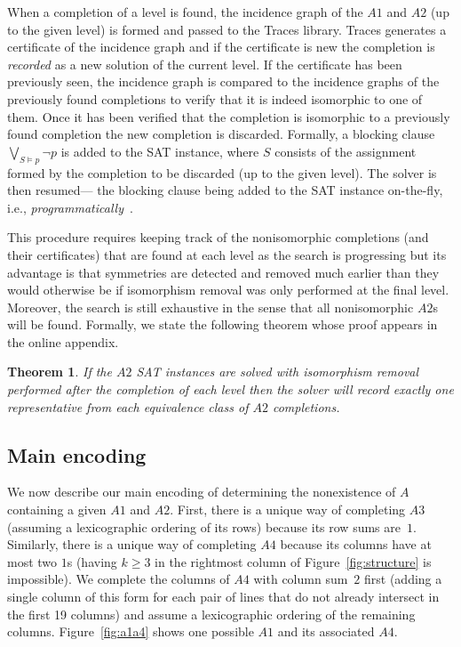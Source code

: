 \documentclass[letterpaper]{article}
\newtheorem{theorem}{Theorem}
\begin{document}
When a completion of a level is found, the
incidence graph of the $A1$
and $A2$ (up to the given level) is formed and passed to the
Traces library.  Traces
generates a certificate of the incidence graph and if the certificate
is new the completion is \emph{recorded} as a new solution of the current
level.  If the certificate has been previously seen, the incidence
graph is compared to the incidence graphs of the previously
found completions to verify that it is indeed isomorphic to one of them.
Once it has been verified that the completion is isomorphic to a previously
found completion the new completion is discarded.
Formally, a blocking clause $\bigvee_{S\models p}\lnot p$ is added
to the SAT instance, where $S$ consists of the assignment
formed by the completion to be discarded (up to the given level).
The solver is then resumed---%
the blocking clause being added to the SAT instance on-the-fly, i.e.,
\emph{programmatically}~\cite{ganesh2012lynx}.

This procedure requires keeping track of the nonisomorphic completions
(and their certificates) that
are found at each level as the search is progressing but its advantage
is that symmetries are detected and removed much earlier than they
would otherwise be if isomorphism removal was only performed at the final level.
Moreover, the search is still exhaustive in the sense that all
nonisomorphic $A2$s will be found.
Formally, we state the following theorem whose proof appears in the
online appendix.

\begin{theorem}\label{thm:record}
If the $A2$ SAT instances are solved with isomorphism removal performed
after the completion of each level then
the solver will record exactly one
representative from each equivalence class
of $A2$ completions.
\end{theorem}

\subsection{Main encoding}\label{subsec:main}

We now describe our main encoding of determining the nonexistence
of $A$ containing a given $A1$ and $A2$.  First, 
there is a unique way of completing $A3$ (assuming a lexicographic ordering of its rows)
because its row sums are~$1$.  Similarly,
there is a unique way of completing $A4$ because its columns
have at most two $1$s (having $k\geq3$ in the rightmost column
of Figure~\ref{fig:structure} is impossible).
We complete the columns of $A4$ with column sum~$2$ first (adding
a single column of this form for each pair of lines that do not already
intersect in the first 19 columns) and assume a lexicographic
ordering of the remaining columns.
Figure~\ref{fig:a1a4} shows one possible $A1$ and its associated $A4$.
\end{document}
